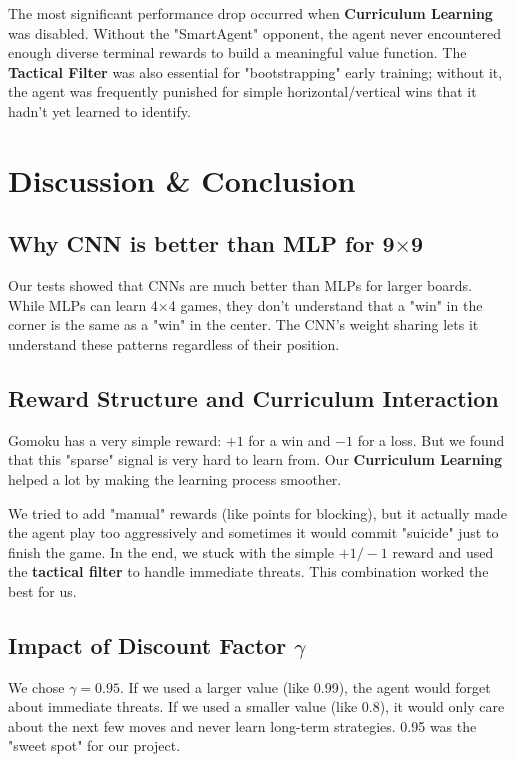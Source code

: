 \documentclass[9pt,a4paper,twocolumn,twoside]{rho-class/rho}
\begin{document}
        The most significant performance drop occurred when \textbf{Curriculum Learning} was disabled. Without the "SmartAgent" opponent, the agent never encountered enough diverse terminal rewards to build a meaningful value function. The \textbf{Tactical Filter} was also essential for "bootstrapping" early training; without it, the agent was frequently punished for simple horizontal/vertical wins that it hadn't yet learned to identify.

\section{Discussion \& Conclusion}
    \subsection{Why CNN is better than MLP for 9$\times$9}
        Our tests showed that CNNs are much better than MLPs for larger boards. While MLPs can learn 4$\times$4 games, they don't understand that a "win" in the corner is the same as a "win" in the center. The CNN's weight sharing lets it understand these patterns regardless of their position.

    \subsection{Reward Structure and Curriculum Interaction}
        Gomoku has a very simple reward: $+1$ for a win and $-1$ for a loss. But we found that this "sparse" signal is very hard to learn from. Our \textbf{Curriculum Learning} helped a lot by making the learning process smoother. 
        
        We tried to add "manual" rewards (like points for blocking), but it actually made the agent play too aggressively and sometimes it would commit "suicide" just to finish the game. In the end, we stuck with the simple $+1/-1$ reward and used the \textbf{tactical filter} to handle immediate threats. This combination worked the best for us.

    \subsection{Impact of Discount Factor $\gamma$}
        We chose $\gamma=0.95$. If we used a larger value (like 0.99), the agent would forget about immediate threats. If we used a smaller value (like 0.8), it would only care about the next few moves and never learn long-term strategies. 0.95 was the "sweet spot" for our project.
\end{document}
